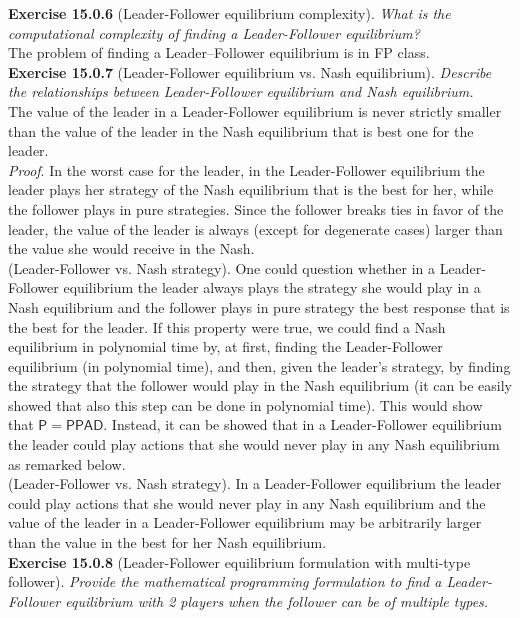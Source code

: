 \textbf{Exercise 15.0.6} (Leader-Follower equilibrium complexity). \textit{What is the computational complexity of finding a Leader-Follower equilibrium?}\\

The problem of finding a Leader–Follower equilibrium is in \textsf{FP} class.\\

\textbf{Exercise 15.0.7} (Leader-Follower equilibrium vs.  Nash equilibrium). \textit{Describe the relationships between Leader-Follower equilibrium and Nash equilibrium.}\\

The value of the leader in a Leader-Follower equilibrium is never strictly smaller than the value of the leader in the Nash equilibrium that is best one for the leader.\\
\textit{Proof}. In the worst case for the leader, in the Leader-Follower equilibrium the leader plays her strategy of the Nash equilibrium that is the best for her, while the follower plays in pure strategies. Since the follower breaks ties in favor of the leader, the value of the leader is always (except for degenerate cases) larger than the value she would receive in the Nash.\\
(Leader-Follower vs. Nash strategy). One could question whether in a Leader-Follower equilibrium the leader always plays the strategy she would play in a Nash equilibrium and the follower plays in pure strategy the best response that is the best for the leader. If this property were true, we could find a Nash equilibrium in polynomial time by, at first, finding the Leader-Follower equilibrium (in polynomial time), and then, given the leader's strategy, by finding the strategy that the follower would play in the Nash equilibrium (it can be easily showed that also this step can be done in polynomial time). This would show that $\mathsf{P=PPAD}$. Instead, it can be showed that in a Leader-Follower equilibrium the leader could play actions that she would never play in any Nash equilibrium as remarked below.\\ (Leader-Follower vs. Nash strategy). In a Leader-Follower equilibrium the leader could play actions that she would never play in any Nash equilibrium and the value of the leader in a Leader-Follower equilibrium may be arbitrarily larger than the value in the best for her Nash equilibrium.\\

\textbf{Exercise 15.0.8} (Leader-Follower equilibrium formulation with multi-type follower). \textit{Provide the mathematical programming formulation to find a Leader-Follower equilibrium with 2 players when the follower can be of multiple types.}\\

